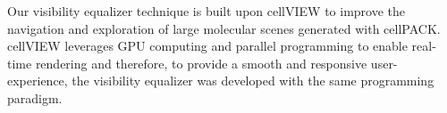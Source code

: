 Our visibility equalizer technique is built upon cellVIEW to improve the navigation and exploration of large molecular scenes generated with cellPACK.
cellVIEW leverages GPU computing and parallel programming to enable real-time rendering and therefore, to provide a smooth and responsive user-experience, the visibility equalizer was developed with the same programming paradigm.




